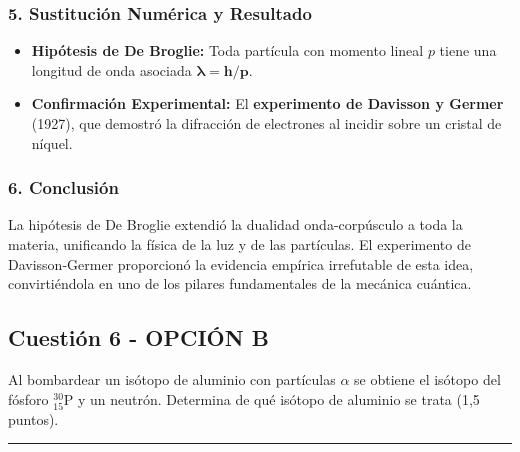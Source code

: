 \subsubsection*{5. Sustitución Numérica y Resultado}
\begin{cajaresultado}
\begin{itemize}
    \item \textbf{Hipótesis de De Broglie:} Toda partícula con momento lineal $p$ tiene una longitud de onda asociada $\boldsymbol{\lambda = h/p}$.
    \item \textbf{Confirmación Experimental:} El \textbf{experimento de Davisson y Germer} (1927), que demostró la difracción de electrones al incidir sobre un cristal de níquel.
\end{itemize}
\end{cajaresultado}

\subsubsection*{6. Conclusión}
\begin{cajaconclusion}
La hipótesis de De Broglie extendió la dualidad onda-corpúsculo a toda la materia, unificando la física de la luz y de las partículas. El experimento de Davisson-Germer proporcionó la evidencia empírica irrefutable de esta idea, convirtiéndola en uno de los pilares fundamentales de la mecánica cuántica.
\end{cajaconclusion}

\newpage

\subsection{Cuestión 6 - OPCIÓN B}
\label{subsec:6B_2009_sep_ext}

\begin{cajaenunciado}
Al bombardear un isótopo de aluminio con partículas $\alpha$ se obtiene el isótopo del fósforo ${}_{15}^{30}\text{P}$ y un neutrón. Determina de qué isótopo de aluminio se trata (1,5 puntos).
\end{cajaenunciado}
\hrule


